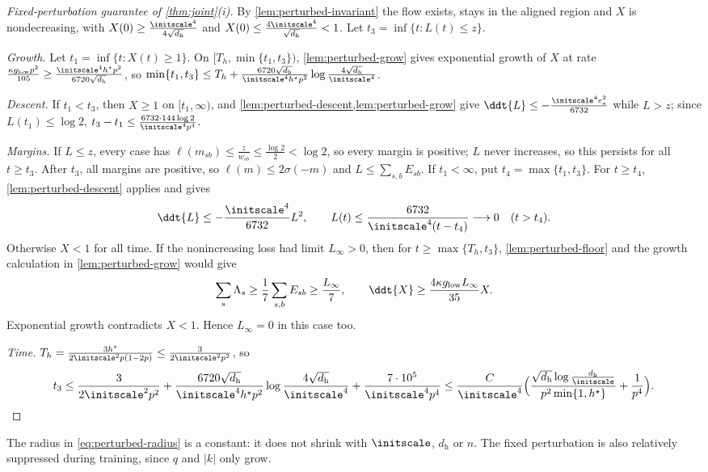 \begin{proof}[Fixed-perturbation guarantee of \cref{thm:joint}(i)]
By \cref{lem:perturbed-invariant} the flow exists, stays in the aligned region and $X$ is nondecreasing, with
$X(0)\ge\frac{\initscale^4}{4\sqrt{d_{\mathrm h}}}$ and $X(0)\le\frac{4\initscale^4}{\sqrt{d_{\mathrm h}}}<1$. Let $t_3=\inf\{t:L(t)\le z\}$.

\emph{Growth.} Let $t_1=\inf\{t:X(t)\ge1\}$. On $[T_h,\min\{t_1,t_3\})$, \cref{lem:perturbed-grow} gives exponential growth of $X$ at rate
$\frac{\kappa g_{\mathrm{low}}p^2}{105}\ge\frac{\initscale^4h^\star p^2}{6720\sqrt{d_{\mathrm h}}}$, so
$\min\{t_1,t_3\}\le T_h+\frac{6720\sqrt{d_{\mathrm h}}}{\initscale^4h^\star p^2}\log\frac{4\sqrt{d_{\mathrm h}}}{\initscale^4}$.

\emph{Descent.} If $t_1<t_3$, then $X\ge1$ on $[t_1,\infty)$, and \cref{lem:perturbed-descent,lem:perturbed-grow} give
$\ddt{L}\le-\frac{\initscale^4e_\ast^2}{6732}$ while $L>z$; since $L(t_1)\le\log2$, $t_3-t_1\le\frac{6732\cdot144\log2}{\initscale^4p^4}$.

\emph{Margins.} If $L\le z$, every case has $\ell(m_{sb})\le\frac{z}{w_{sb}}\le\frac{\log2}2<\log2$, so every margin is positive; $L$ never increases,
so this persists for all $t\ge t_3$. After $t_3$, all margins are positive, so
$\ell(m)\le2\sigma(-m)$ and $L\le\sum_{s,b}E_{sb}$.
If $t_1<\infty$, put $t_4=\max\{t_1,t_3\}$. For $t\ge t_4$,
\cref{lem:perturbed-descent} applies and gives
\[
 \ddt{L}\le-\frac{\initscale^4}{6732}L^2,\qquad
 L(t)\le\frac{6732}{\initscale^4(t-t_4)}\longrightarrow0
 \quad(t>t_4).
\]
Otherwise $X<1$ for all time. If the nonincreasing loss had limit
$L_\infty>0$, then for $t\ge\max\{T_h,t_3\}$,
\cref{lem:perturbed-floor} and the growth calculation in
\cref{lem:perturbed-grow} would give
\[
 \sum_s\Lambda_s\ge\frac17\sum_{s,b}E_{sb}\ge\frac{L_\infty}{7},\qquad
 \ddt{X}\ge\frac{4\kappa g_{\mathrm{low}}L_\infty}{35}X.
\]
Exponential growth contradicts $X<1$. Hence $L_\infty=0$ in this case too.

\emph{Time.} $T_h=\frac{3h^\star}{2\initscale^2p(1-2p)}\le\frac{3}{2\initscale^2p^2}$, so
\[
 t_3\le\frac{3}{2\initscale^2p^2}+\frac{6720\sqrt{d_{\mathrm h}}}{\initscale^4h^\star p^2}\log\frac{4\sqrt{d_{\mathrm h}}}{\initscale^4}+\frac{7\cdot10^5}{\initscale^4p^4}
 \le\frac{C}{\initscale^4}\Bigl(\frac{\sqrt{d_{\mathrm h}}\log\frac{d_{\mathrm h}}{\initscale}}{p^2\min\{1,h^\star\}}+\frac1{p^4}\Bigr).\qedhere
\]
\end{proof}

The radius in \cref{eq:perturbed-radius} is a constant: it does not shrink with $\initscale$, $d_{\mathrm h}$ or $n$. The fixed perturbation is also
relatively suppressed during training, since $q$ and $|k|$ only grow.

